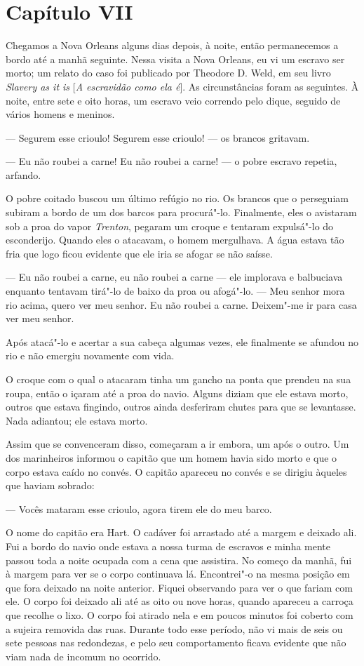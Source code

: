 \chapter{Capítulo VII}

Chegamos a Nova Orleans alguns dias depois, à noite, então permanecemos
a bordo até a manhã seguinte. Nessa visita a Nova Orleans, eu vi um
escravo ser morto; um relato do caso foi publicado por Theodore D. Weld,
em seu livro \emph{Slavery as it is} {[}\emph{A escravidão como ela
é}{]}. As circunstâncias foram as seguintes. À noite, entre sete e oito
horas, um escravo veio correndo pelo dique, seguido de vários homens e
meninos.

--- Segurem esse crioulo! Segurem esse crioulo! --- os brancos gritavam.

--- Eu não roubei a carne! Eu não roubei a carne! --- o pobre escravo
repetia, arfando.

O pobre coitado buscou um último refúgio no rio. Os brancos que o
perseguiam subiram a bordo de um dos barcos para procurá"-lo. Finalmente,
eles o avistaram sob a proa do vapor \emph{Trenton}, pegaram um croque e
tentaram expulsá"-lo do esconderijo. Quando eles o atacavam, o homem
mergulhava. A água estava tão fria que logo ficou evidente que ele iria
se afogar se não saísse.

--- Eu não roubei a carne, eu não roubei a carne --- ele implorava e
balbuciava enquanto tentavam tirá"-lo de baixo da proa ou afogá"-lo. ---
Meu senhor mora rio acima, quero ver meu senhor. Eu não roubei a carne.
Deixem"-me ir para casa ver meu senhor.

Após atacá"-lo e acertar a sua cabeça algumas vezes, ele finalmente se
afundou no rio e não emergiu novamente com vida.

O croque com o qual o atacaram tinha um gancho na ponta que prendeu na
sua roupa, então o içaram até a proa do navio. Alguns diziam que ele
estava morto, outros que estava fingindo, outros ainda desferiram chutes
para que se levantasse. Nada adiantou; ele estava morto.

Assim que se convenceram disso, começaram a ir embora, um após o outro.
Um dos marinheiros informou o capitão que um homem havia sido morto e
que o corpo estava caído no convés. O capitão apareceu no convés e se
dirigiu àqueles que haviam sobrado:

--- Vocês mataram esse crioulo, agora tirem ele do meu barco.

O nome do capitão era Hart. O cadáver foi arrastado até a margem e
deixado ali. Fui a bordo do navio onde estava a nossa turma de escravos
e minha mente passou toda a noite ocupada com a cena que assistira. No
começo da manhã, fui à margem para ver se o corpo continuava lá.
Encontrei"-o na mesma posição em que fora deixado na noite anterior.
Fiquei observando para ver o que fariam com ele. O corpo foi deixado ali
até as oito ou nove horas, quando apareceu a carroça que recolhe o lixo.
O corpo foi atirado nela e em poucos minutos foi coberto com a sujeira
removida das ruas. Durante todo esse período, não vi mais de seis ou
sete pessoas nas redondezas, e pelo seu comportamento ficava evidente
que não viam nada de incomum no ocorrido.

